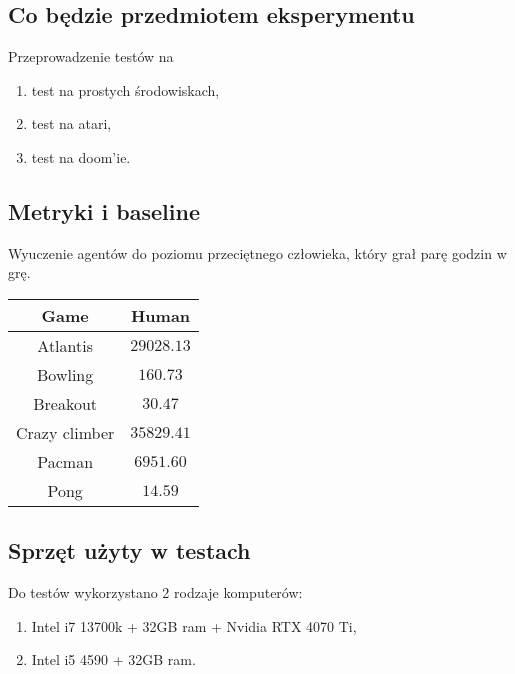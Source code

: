   \subsection{Co będzie przedmiotem eksperymentu}
    Przeprowadzenie testów na 
    \begin{enumerate}
      \item test na prostych środowiskach,
      \item test na atari,
      \item test na doom'ie.
    \end{enumerate}

  \subsection{Metryki i baseline}
    
      
        Wyuczenie agentów do poziomu przeciętnego człowieka, który grał parę godzin w grę.  
     
        \begin{tabular}[H]{||c c||} 
        \hline
        Game & Human \\ [0.5ex] 
        \hline\hline
        Atlantis & $29028.13$ \\ 
        \hline
        Bowling & $160.73$  \\
        \hline
        Breakout & $30.47$ \\
        \hline
        Crazy climber & $35829.41$  \\
        \hline
        Pacman & $6951.60$  \\
        \hline
        Pong & $14.59$  \\ [1ex] 
        \hline
        \end{tabular}

  \subsection{Sprzęt użyty w testach}
    Do testów wykorzystano 2 rodzaje komputerów:
    \begin{enumerate}
      \item Intel i7 13700k + 32GB ram + Nvidia RTX 4070 Ti,
      \item Intel i5 4590 + 32GB ram.
    \end{enumerate}  

